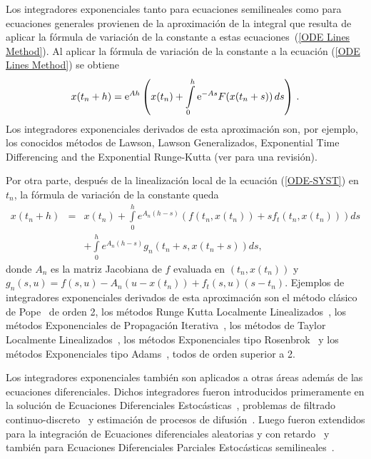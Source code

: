 Los integradores exponenciales tanto para ecuaciones semilineales como para ecuaciones generales provienen de la aproximación de la integral
que resulta de aplicar la fórmula de variación de la constante a estas ecuaciones~(\ref{ODE Lines Method}). Al aplicar la fórmula de variación
de la constante a la ecuación (\ref{ODE Lines Method}) se obtiene
\begin{equation}
x(t_n+h)=\mathrm{e}^{Ah}\left(x(t_n) +\int\limits_{0}^{h} \mathrm{e}^{-As}F(x(t_n+s)) \,ds\right)\,. \label{VCF2}
\end{equation}
Los integradores exponenciales derivados de esta aproximación son, por ejemplo, los conocidos métodos de Lawson, Lawson Generalizados, Exponential Time
Differencing and the Exponential Runge-Kutta (ver \cite{Berland07} para una revisión). 

Por otra parte, después de la linealización local de la ecuación (\ref{ODE-SYST}) en $t_{n}$,  la fórmula de variación
de la constante queda
\begin{eqnarray}
x(t_{n}+h) &= & x(t_{n})+\int\limits_{0}^{h}e^{A	_{n}(h-s)}(f(t_n,x(t_{n}))+sf_t(t_n,x(t_{n})))ds \nonumber \\
 & & +\int\limits_{0}^{h}e^{A
	_{n}(h-s)}g_{n}(t_{n}+s,x(t_{n}+s))ds, \label{VCF}
\end{eqnarray}
donde $A_{n}$ es la matriz Jacobiana de $f$ evaluada en $(t_n,x(t_{n}))$ y $g_{n}(s,u)=f(s,u)-A_{n}(u-x(t_n))+f_t(s,u)(s-t_n)$. 
Ejemplos de integradores exponenciales derivados de esta aproximación son el método clásico de Pope~\cite{pope1963exponential} de orden 2, los métodos Runge Kutta Localmente 
Linealizados~\cite{delaCruz06,Jimenez13,Jimenez14AMC}, los métodos Exponenciales de Propagación 
Iterativa~\cite{tokman2013comparative}, los métodos de Taylor Localmente Linealizados~\cite{delaCruz07}, los
métodos Exponenciales tipo Rosenbrok~\cite{hochbruck2009exponential} y los métodos Exponenciales tipo Adams~\cite{hochbruck2011exponential}, todos de orden superior a 2.

Los integradores exponenciales también son aplicados a otras áreas además de las ecuaciones diferenciales. Dichos integradores fueron introducidos primeramente en la solución de Ecuaciones Diferenciales Estocásticas~\cite{ozaki19852,ozaki1985statistical}, problemas de filtrado continuo-discreto~\cite{ozaki1993local} y estimación de procesos de difusión~\cite{ozaki19852,ozaki1985statistical,ozaki1994local}. Luego fueron extendidos para la integración de Ecuaciones diferenciales aleatorias%
y con retardo~\cite{jimenez2006local} y también para Ecuaciones Diferenciales
Parciales Estocásticas semilineales~\cite{jentzen2009overcoming,kloeden2011exponential}.

